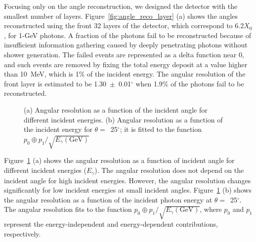 \documentclass[preprint,12pt,times,a4paper]{elsarticle}
\begin{document}
Focusing only on the angle reconstruction, we designed the detector with the smallest number of layers. Figure~\ref{fig:angle_reco_layer} (a) shows the angles reconstructed using the front 32 layers of the detector, which correspond to 6.2$X_{0}$, for 1-GeV photons. A fraction of the photons fail to be reconstructed because of insufficient information gathering caused by deeply penetrating photons without shower generation. The failed events are represented as a delta function near 0, and such events are removed by fixing the total energy deposit at a value higher than 10~MeV, which is 1\% of the incident energy. The angular resolution of the front layer is estimated to be 1.30~$\pm$~0.01$^{\circ}$ when 1.9\% of the photons fail to be reconstructed.

\begin{figure}[!hbt]
\centering
{}
\caption{ (a) Angular resolution as a function of the incident angle for different incident energies. (b) Angular resolution as a function of the incident energy for $\theta=$~25$^{\circ}$; it is fitted to the function $p_{0} \oplus p_{1}/\sqrt{E_{\gamma}(\mathrm{GeV})}$ }
\label{fig:angle_reco_dep_gr}
\end{figure}

Figure~\ref{fig:angle_reco_dep_gr} (a) shows the angular resolution as a function of incident angle for different incident energies ($E_{\gamma}$). The angular resolution does not depend on the incident angle for high incident energies. However, the angular resolution changes significantly for low incident energies at small incident angles. Figure~\ref{fig:angle_reco_dep_gr} (b) shows the angular resolution as a function of the incident photon energy at $\theta=$~25$^{\circ}$. The angular resolution fits to the function $p_{0} \oplus p_{1}/\sqrt{E_{\gamma}(\mathrm{GeV})}$, where $p_{0}$ and $p_{1}$ represent the energy-independent and energy-dependent contributions, respectively.
\end{document}
